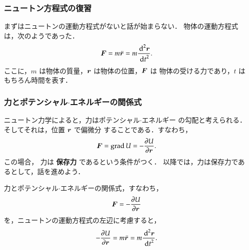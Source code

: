             \subsubsection{ニュートン方程式の復習}
            まずはニュートンの運動方程式がないと話が始まらない．
            物体の運動方程式は，次のようであった．
                \begin{align}
                    \boldsymbol{F} = m\ddot{\boldsymbol{r}} = m \frac{{\,\mathrm{d}}^{2} \boldsymbol{r}}{{\,\mathrm{d} t}^{2}}.
                \end{align}
            ここに，$m$ は物体の質量，$\boldsymbol{r}$ は物体の位置，$\boldsymbol{F}$ は
            物体の受ける力であり，$t$ はもちろん時間を表す．

            \subsubsection{力とポテンシャル$\cdot$エネルギーの関係式}
            ニュートン力学によると，力はポテンシャル$\cdot$エネルギー
            の勾配と考えられる．そしてそれは，位置 $\boldsymbol{r}$ で偏微分
            することである．すなわち，
                \begin{align}
                    \boldsymbol{F} = \mathrm{grad}\, U = -\frac{\partial U}{\partial \boldsymbol{r}}.
                \end{align}
            この場合，
            力は \textbf{保存力} であるという条件がつく．
            以降では，力は保存力であるとして，話を進めよう．

            力とポテンシャル$\cdot$エネルギーの関係式，すなわち，
                \begin{equation*}
                    \boldsymbol{F} = -\frac{\partial U}{\partial \boldsymbol{r}}
                \end{equation*}
            を，ニュートンの運動方程式の左辺に考慮すると，
                \begin{align}
                    -\frac{\partial U}{\partial \boldsymbol{r}} = m\ddot{\boldsymbol{r}} = m \frac{{\,\mathrm{d}}^{2} \boldsymbol{r}}{{\,\mathrm{d} t}^{2}}.
                \end{align}

